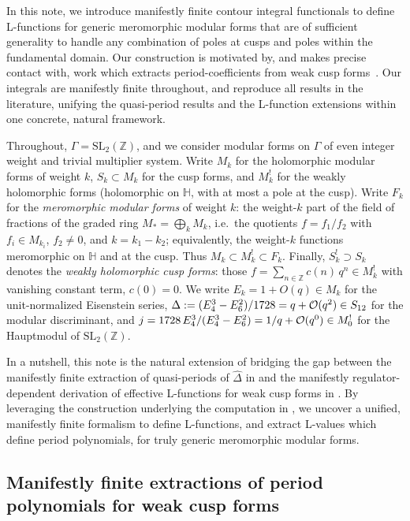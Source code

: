 \documentclass[11pt]{article}
\numberwithin{equation}{section}  %
\newcommand{\HH}{\mathbb{H}}
\newcommand{\ZZ}{\mathbb{Z}}
\newcommand{\SLZ}{\mathrm{SL}_2(\ZZ)}
\newcommand{\Dhat}{\widehat{\Delta}}
\begin{document}
In this note, we introduce manifestly finite contour integral functionals to define
L-functions for generic meromorphic modular forms that are of sufficient generality
to handle any combination of poles at cusps and poles within the fundamental domain.
Our construction is motivated by, and makes precise contact with, work which extracts
period-coefficients from weak cusp forms~\cite{Brown2017}. Our integrals are
manifestly finite throughout, and reproduce all results in the literature, unifying the
quasi-period results and the L-function extensions within one concrete, natural framework.
 
Throughout, $\Gamma = \SLZ$, and we consider modular forms on $\Gamma$ of
even integer weight and trivial multiplier system.  Write $M_k$ for the
holomorphic modular forms of weight $k$, $S_k \subset M_k$ for the cusp
forms, and $M^!_k$ for the weakly holomorphic forms (holomorphic on
$\HH$, with at most a pole at the cusp).  Write $F_k$ for the
\emph{meromorphic modular forms} of weight $k$: the weight-$k$ part of
the field of fractions of the graded ring $M_* = \bigoplus_k M_k$, i.e.\
the quotients $f = f_1/f_2$ with $f_i \in M_{k_i}$, $f_2 \ne 0$, and
$k = k_1 - k_2$; equivalently, the weight-$k$ functions meromorphic on
$\HH$ and at the cusp.  Thus $M_k \subset M^!_k \subset F_k$.  Finally,
$S^!_k \supset S_k$ denotes the \emph{weakly holomorphic cusp forms}:
those $f = \sum_{n \in \ZZ} c(n)\,q^n \in M^!_k$ with vanishing constant
term, $c(0) = 0$. %
We write $E_k = 1 + O(q) \in M_k$ for the unit-normalized
Eisenstein series, $\Delta := (E_4^3 - E_6^2)/1728 = q + {\cal O}(q^2)
\in S_{12}$ for the modular discriminant,
and $j = 1728\,E_4^3/(E_4^3 - E_6^2) = 1/q + {\cal O}(q^0) \in M^!_0$
for the Hauptmodul of $\SLZ$.

In a nutshell, this note is the natural extension of bridging the gap between the 
manifestly finite extraction of quasi-periods of $\Dhat$ in \cite{Brown2017} and the 
manifestly regulator-dependent derivation of effective L-functions for weak cusp forms 
in \cite{BFK2011}. By leveraging the construction underlying the computation in \cite{Brown2017}, we 
uncover a unified, manifestly finite formalism to define L-functions, and extract L-values 
which define period polynomials, for truly generic meromorphic modular forms. 

\subsection{Manifestly finite extractions of period polynomials for weak cusp forms}
\end{document}
